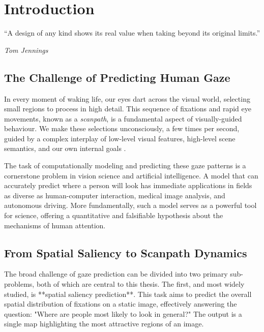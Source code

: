 \chapter{Introduction}
\label{c:intro}

%
%
\epigraph{\enquote{A design of any kind shows its real value when taking beyond its original limits.}}{\emph{Tom Jennings}}

\section{The Challenge of Predicting Human Gaze}
\label{sec:intro_challenge}

In every moment of waking life, our eyes dart across the visual world, selecting small regions to process in high detail. This sequence of fixations and rapid eye movements, known as a \textit{scanpath}, is a fundamental aspect of visually-guided behaviour. We make these selections unconsciously, a few times per second, guided by a complex interplay of low-level visual features, high-level scene semantics, and our own internal goals \cite{kummerer2023predicting}.

The task of computationally modeling and predicting these gaze patterns is a cornerstone problem in vision science and artificial intelligence. A model that can accurately predict where a person will look has immediate applications in fields as diverse as human-computer interaction, medical image analysis, and autonomous driving. More fundamentally, such a model serves as a powerful tool for science, offering a quantitative and falsifiable hypothesis about the mechanisms of human attention.

\section{From Spatial Saliency to Scanpath Dynamics}
\label{sec:intro_taxonomy}

The broad challenge of gaze prediction can be divided into two primary sub-problems, both of which are central to this thesis. The first, and most widely studied, is **spatial saliency prediction**. This task aims to predict the overall spatial distribution of fixations on a static image, effectively answering the question: "Where are people most likely to look in general?" The output is a single map highlighting the most attractive regions of an image.


